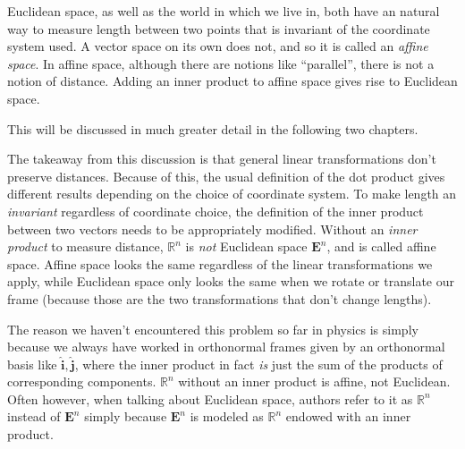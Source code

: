 \documentclass[../master.tex]{subfiles}
\begin{document}
	Euclidean space, as well as the world in which we live in, both have an natural way to measure length between two points that is invariant of the coordinate system used. A vector space on its own does not, and so it is called an \emph{affine space}. In affine space, although there are notions like ``parallel'', there is not a notion of distance. Adding an inner product to affine space gives rise to Euclidean space.
	
	
	This will be discussed in much greater detail in the following two chapters. 
	
	The takeaway from this discussion is that general linear transformations don't preserve distances. Because of this, the usual definition of the dot product gives different results depending on the choice of coordinate system. To make length an \emph{invariant} regardless of coordinate choice, the definition of the inner product between two vectors needs to be appropriately modified. Without an \emph{inner product} to measure distance, $\mathbb{R}^n$ is \emph{not} Euclidean space $\mathbf{E}^n$, and is called affine space. Affine space looks the same regardless of the linear transformations we apply, while Euclidean space only looks the same when we rotate or translate our frame (because those are the two transformations that don't change lengths). 
	
	The reason we haven't encountered this problem so far in physics is simply because we always have worked in orthonormal frames given by an orthonormal basis like $\hat{\mathbf{i}}, \hat{\mathbf{j}}$, where the inner product in fact \emph{is} just the sum of the products of corresponding components. $\mathbb{R}^n$ without an inner product is affine, not Euclidean. Often however, when talking about Euclidean space, authors refer to it as $\mathbb{R}^n$ instead of $\mathbf{E}^n$ simply because $\mathbf{E}^n$ is modeled as $\mathbb{R}^n$ endowed with an inner product.
	
	
\end{document}
